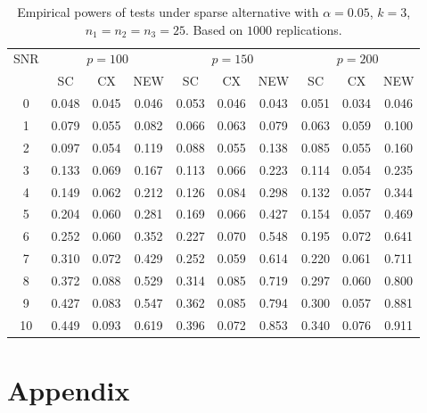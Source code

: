 \documentclass[review]{elsarticle}
\theoremstyle{plain}
\theoremstyle{definition}
\theoremstyle{remark}
\begin{document}
\begin{table}[!hbp]
    \caption{Empirical powers of tests under sparse alternative with $\alpha=0.05$, $k=3$, $n_1=n_2=n_3=25$. Based on $1000$ replications.}
    \centering
\begin{tabular}{*{10}{c}}
\toprule
\multirow{2}{*}{SNR} &\multicolumn{3}{c}{$p=100$}&\multicolumn{3}{c}{$p=150$}&\multicolumn{3}{c}{$p=200$} \\
    \cmidrule(r){2-4}\cmidrule(r){5-7}\cmidrule(r){8-10}
    &SC & CX & NEW& SC & CX & NEW &SC & CX & NEW\\
\midrule
0 & 0.048 & 0.045 & 0.046 & 0.053 & 0.046 & 0.043 & 0.051 & 0.034 & 0.046 \\ 
1 & 0.079 & 0.055 & 0.082 & 0.066 & 0.063 & 0.079 & 0.063 & 0.059 & 0.100 \\ 
2 & 0.097 & 0.054 & 0.119 & 0.088 & 0.055 & 0.138 & 0.085 & 0.055 & 0.160 \\ 
3 & 0.133 & 0.069 & 0.167 & 0.113 & 0.066 & 0.223 & 0.114 & 0.054 & 0.235 \\ 
4 & 0.149 & 0.062 & 0.212 & 0.126 & 0.084 & 0.298 & 0.132 & 0.057 & 0.344 \\ 
5 & 0.204 & 0.060 & 0.281 & 0.169 & 0.066 & 0.427 & 0.154 & 0.057 & 0.469 \\ 
6 & 0.252 & 0.060 & 0.352 & 0.227 & 0.070 & 0.548 & 0.195 & 0.072 & 0.641 \\ 
7 & 0.310 & 0.072 & 0.429 & 0.252 & 0.059 & 0.614 & 0.220 & 0.061 & 0.711 \\ 
8 & 0.372 & 0.088 & 0.529 & 0.314 & 0.085 & 0.719 & 0.297 & 0.060 & 0.800 \\ 
9 & 0.427 & 0.083 & 0.547 & 0.362 & 0.085 & 0.794 & 0.300 & 0.057 & 0.881 \\ 
10 & 0.449 & 0.093 & 0.619 & 0.396 & 0.072 & 0.853 & 0.340 & 0.076 & 0.911 \\ 
\bottomrule
\end{tabular}
\end{table}

\section{Appendix}
\end{document}
